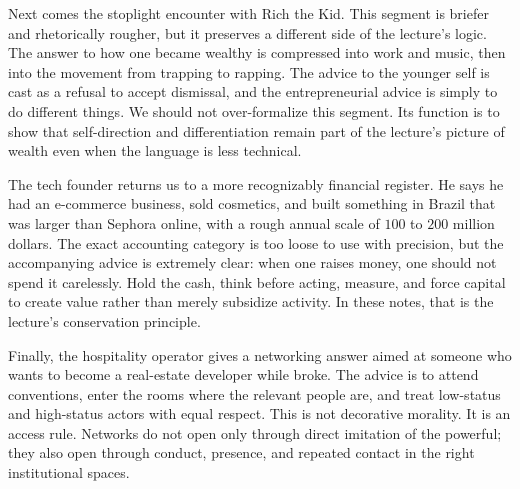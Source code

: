 Next comes the stoplight encounter with Rich the Kid. This segment is briefer and rhetorically rougher, but it preserves a different side of the lecture's logic. The answer to how one became wealthy is compressed into work and music, then into the movement from trapping to rapping. The advice to the younger self is cast as a refusal to accept dismissal, and the entrepreneurial advice is simply to do different things. We should not over-formalize this segment. Its function is to show that self-direction and differentiation remain part of the lecture's picture of wealth even when the language is less technical.

The tech founder returns us to a more recognizably financial register. He says he had an e-commerce business, sold cosmetics, and built something in Brazil that was larger than Sephora online, with a rough annual scale of \(100\) to \(200\) million dollars. The exact accounting category is too loose to use with precision, but the accompanying advice is extremely clear: when one raises money, one should not spend it carelessly. Hold the cash, think before acting, measure, and force capital to create value rather than merely subsidize activity. In these notes, that is the lecture's conservation principle.

Finally, the hospitality operator gives a networking answer aimed at someone who wants to become a real-estate developer while broke. The advice is to attend conventions, enter the rooms where the relevant people are, and treat low-status and high-status actors with equal respect. This is not decorative morality. It is an access rule. Networks do not open only through direct imitation of the powerful; they also open through conduct, presence, and repeated contact in the right institutional spaces.

